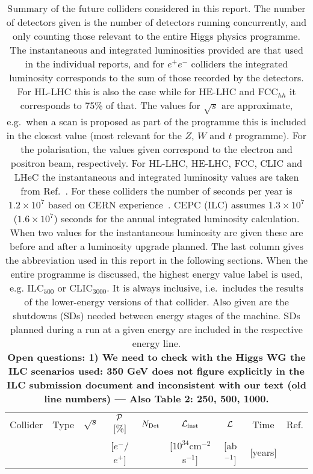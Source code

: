 \begin{table}
\caption{Summary of the future colliders considered in this report. The number of detectors given is the number of detectors running concurrently, and only counting those relevant to the entire Higgs physics programme. The instantaneous and integrated luminosities provided are that used in the individual reports, and for $e^+e^-$ colliders the integrated luminosity corresponds to the sum of those recorded by the detectors. For HL-LHC this is also the case while for HE-LHC and FCC$_{hh}$ it corresponds to 75\% of that. The values for $\sqrt{s}$ are approximate, e.g.\ when a scan is proposed as part of the programme  this is included in the closest value (most relevant for the $Z$, $W$ and $t$ programme). For the polarisation, the values given correspond to the electron and positron beam, respectively. For HL-LHC, HE-LHC, FCC, CLIC and LHeC the instantaneous and integrated luminosity values are taken from Ref.~\cite{Bordry:2018gri}. For these colliders the number of seconds per year is $1.2\times 10^{7}$ based on CERN experience~\cite{Bordry:2018gri}. CEPC (ILC) assumes $1.3\times 10^{7}$ ($1.6\times 10^{7}$) seconds for the annual integrated luminosity calculation. When two values for the instantaneous luminosity are given these are before and after a luminosity upgrade planned.
The last column gives the abbreviation used in this report in the following sections. When the entire programme is discussed, the highest energy value label is used, e.g. ILC$_{500}$ or CLIC$_{3000}$. It is always inclusive, i.e.\ includes the results of the lower-energy versions of that collider. Also given are the shutdowns (SDs) needed between energy stages of the machine. SDs planned during a run at a given energy are included in the respective energy line.
\protect\\
{\bf Open questions:  
1) We need to check with the Higgs WG the ILC scenarios used: 350 GeV does not figure explicitly in the ILC submission document and inconsistent with our text (old line numbers) ---
Also Table 2: 250, 500, 1000. 
\label{table:future-colliders}}}
\begin{center}
\begin{tabular}{|l|ccccc|cc|l|} %
\hline\hline
Collider & Type & $\sqrt{s}$ & $\cal{P}$ [\%] & $N_{\rm Det}$& $\cal{L}_{\rm inst}$ & $\cal{L}$ & Time  & Ref.\\
& &  & [$e^-$/$e^+$] & & \small [$10^{34}$cm$^{-2}$s$^{-1}]$ & [ab$^{-1}$] & [years] &\\\hline

\end{tabular}
\end{center}
\end{table}
